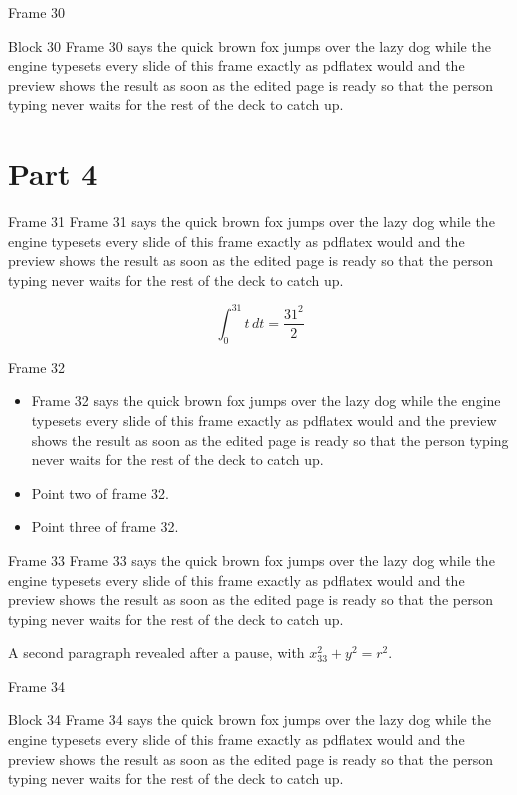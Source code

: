 \documentclass{beamer}
\begin{document}
\begin{frame}{Frame 30}
  \begin{block}{Block 30}
    Frame 30 says the quick brown fox jumps over the lazy dog while the engine typesets every slide of this frame exactly as pdflatex would and the preview shows the result as soon as the edited page is ready so that the person typing never waits for the rest of the deck to catch up.
  \end{block}
\end{frame}
\section{Part 4}
\begin{frame}{Frame 31}
  Frame 31 says the quick brown fox jumps over the lazy dog while the engine typesets every slide of this frame exactly as pdflatex would and the preview shows the result as soon as the edited page is ready so that the person typing never waits for the rest of the deck to catch up.

  \[ \int_0^{31} t\,dt = \frac{31^2}{2} \]
\end{frame}
\begin{frame}{Frame 32}
  \begin{itemize}
    \item<1-> Frame 32 says the quick brown fox jumps over the lazy dog while the engine typesets every slide of this frame exactly as pdflatex would and the preview shows the result as soon as the edited page is ready so that the person typing never waits for the rest of the deck to catch up.
    \item<2-> Point two of frame 32.
    \item<3-> Point three of frame 32.
  \end{itemize}
\end{frame}
\begin{frame}{Frame 33}
  Frame 33 says the quick brown fox jumps over the lazy dog while the engine typesets every slide of this frame exactly as pdflatex would and the preview shows the result as soon as the edited page is ready so that the person typing never waits for the rest of the deck to catch up.
  \pause

  A second paragraph revealed after a pause, with $x_{33}^2 + y^2 = r^2$.
\end{frame}
\begin{frame}{Frame 34}
  \begin{block}{Block 34}
    Frame 34 says the quick brown fox jumps over the lazy dog while the engine typesets every slide of this frame exactly as pdflatex would and the preview shows the result as soon as the edited page is ready so that the person typing never waits for the rest of the deck to catch up.
  \end{block}
\end{frame}
\end{document}
